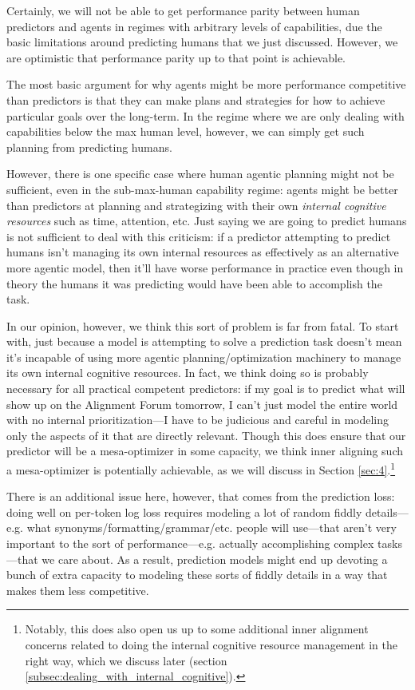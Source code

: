 \documentclass[
  twocolumn,
  natbib,
]{miri-tech-article}
\begin{document}
Certainly, we will not be able to get performance parity between human predictors and agents in regimes with arbitrary levels of capabilities, due the basic limitations around predicting humans that we just discussed. However, we are optimistic that performance parity up to that point is achievable.

The most basic argument for why agents might be more performance competitive than predictors is that they can make plans and strategies for how to achieve particular goals over the long-term. In the regime where we are only dealing with capabilities below the max human level, however, we can simply get such planning from predicting humans.

However, there is one specific case where human agentic planning might not be sufficient, even in the sub-max-human capability regime: agents might be better than predictors at planning and strategizing with their own \textit{internal cognitive resources} such as time, attention, etc. Just saying we are going to predict humans is not sufficient to deal with this criticism: if a predictor attempting to predict humans isn't managing its own internal resources as effectively as an alternative more agentic model, then it'll have worse performance in practice even though in theory the humans it was predicting would have been able to accomplish the task.

In our opinion, however, we think this sort of problem is far from fatal. To start with, just because a model is attempting to solve a prediction task doesn't mean it's incapable of using more agentic planning/optimization machinery to manage its own internal cognitive resources. In fact, we think doing so is probably necessary for all practical competent predictors: if my goal is to predict what will show up on the Alignment Forum tomorrow, I can't just model the entire world with no internal prioritization---I have to be judicious and careful in modeling only the aspects of it that are directly relevant. Though this does ensure that our predictor will be a mesa-optimizer\cite{risks} in some capacity, we think inner aligning such a mesa-optimizer is potentially achievable, as we will discuss in Section \ref{sec:4}.\footnote{Notably, this does also open us up to some additional inner alignment concerns related to doing the internal cognitive resource management in the right way, which we discuss later (section \ref{subsec:dealing_with_internal_cognitive}).}

There is an additional issue here, however, that comes from the prediction loss: doing well on per-token log loss requires modeling a lot of random fiddly details---e.g. what synonyms/formatting/grammar/etc. people will use---that aren't very important to the sort of performance---e.g. actually accomplishing complex tasks---that we care about. As a result, prediction models might end up devoting a bunch of extra capacity to modeling these sorts of fiddly details in a way that makes them less competitive.
\end{document}
